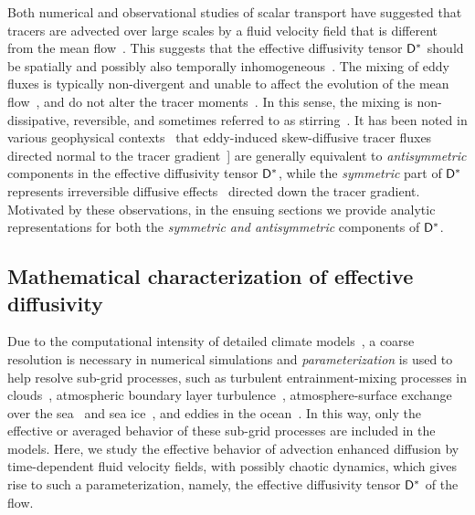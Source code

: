 \documentclass[amsa]{ipart}
\begin{document}
Both numerical and observational studies of scalar transport have
suggested that tracers are advected over large scales by a fluid
velocity field that is different from the mean
flow~\cite{Pavliotis:PHD_Thesis}. This suggests that the effective
diffusivity tensor $\mathsf{D}^*$ should be spatially and possibly also
temporally inhomogeneous~\cite{Pavliotis:PHD_Thesis}. The mixing of
eddy fluxes is typically non-divergent and unable to affect the
evolution of the mean flow~\cite{Middleton:JPO:5840223}, and do not
alter the tracer moments~\cite{Griffies:JPO:1998}. In this sense, the
mixing is non-dissipative, reversible, and sometimes referred to as
stirring~\cite{Eckart:JMR:1948,Griffies:JPO:1998}. It has been noted
in various geophysical contexts~\cite{Plumb:JAS:1979,Plumb:JAS:1987}
that eddy-induced skew-diffusive tracer fluxes directed normal to
the tracer gradient~\cite{Middleton:JPO:5840223}] are generally
equivalent to \emph{antisymmetric} components in the effective
diffusivity tensor $\mathsf{D}^*$, while the \emph{symmetric} part of $\mathsf{D}^*$
represents irreversible diffusive
effects~\cite{Redi:JPO:1982:1154,Solomon:OGR:1971:233,Griffies:JPO:1998}
directed down the tracer gradient.  Motivated by these observations,
in the ensuing sections we provide analytic representations for both
the \emph{symmetric and antisymmetric} components of $\mathsf{D}^*$. 



\subsection{Mathematical characterization of effective diffusivity}
%
Due to the computational intensity of detailed climate
models~\cite{Griffies:2003:10.1007,Washington:1986:9780935702521,Neelin:2010:CCCM},
a coarse resolution is necessary in numerical simulations and
\emph{parameterization} is used to help resolve sub-grid
processes, such as turbulent 
entrainment-mixing processes in clouds~\cite{Lu:JGR:D50094},
atmospheric boundary layer turbulence~\cite{Bretherton:JOC:5655449},
atmosphere-surface exchange over the
sea~\cite{Fairall:1996:JGRC6562} and sea
ice~\cite{Sorensen:TC:2014,Andreas:2010:QJ618,Andreas:JH:2010,Vihma:2014:9923},
and eddies in the ocean~\cite{McDougall:2001:book,Gent:JPO:1995}. In
this way, only the effective or averaged behavior of these sub-grid
processes are included in the models. Here, we study the effective
behavior of advection enhanced diffusion by time-dependent fluid
velocity fields, with possibly chaotic dynamics, which gives rise to
such a parameterization, namely, the effective diffusivity tensor
$\mathsf{D}^*$ of the flow. 
\end{document}
